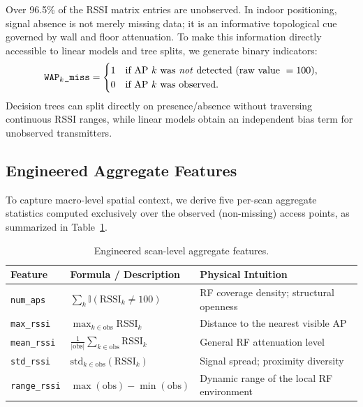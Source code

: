Over 96.5\% of the RSSI matrix entries are unobserved. In indoor positioning, signal absence is not merely
missing data; it is an informative topological cue governed by wall and floor attenuation. To make this
information directly accessible to linear models and tree splits, we generate binary indicators:
\[
  \texttt{WAP}_k\texttt{\_miss} =
  \begin{cases}
    1 & \text{if AP $k$ was \emph{not} detected (raw value } = 100\text{),}\\
    0 & \text{if AP $k$ was observed.}
  \end{cases}
\]
Decision trees can split directly on presence/absence without traversing continuous RSSI ranges, while
linear models obtain an independent bias term for unobserved transmitters.

\subsection{Engineered Aggregate Features}

To capture macro-level spatial context, we derive five per-scan aggregate statistics computed exclusively over
the observed (non-missing) access points, as summarized in Table~\ref{tab:aggregates}.

\begin{table}[!t]
  \centering
  \caption{Engineered scan-level aggregate features.}
  \label{tab:aggregates}
  \begin{tabular}{lll}
    \toprule
    \textbf{Feature} & \textbf{Formula / Description} & \textbf{Physical Intuition} \\
    \midrule
    \texttt{num\_aps}    & $\sum_k \mathbb{I}(\text{RSSI}_k \neq 100)$ & RF coverage density; structural openness \\
    \texttt{max\_rssi}   & $\max_{k \in \text{obs}} \text{RSSI}_k$     & Distance to the nearest visible AP \\
    \texttt{mean\_rssi}  & $\frac{1}{|\text{obs}|}\sum_{k \in \text{obs}} \text{RSSI}_k$ & General RF attenuation level \\
    \texttt{std\_rssi}   & $\text{std}_{k \in \text{obs}} (\text{RSSI}_k)$ & Signal spread; proximity diversity \\
    \texttt{range\_rssi} & $\max(\text{obs}) - \min(\text{obs})$       & Dynamic range of the local RF environment \\
    \bottomrule
  \end{tabular}
\end{table}

